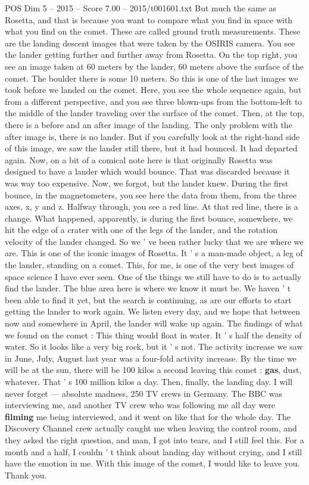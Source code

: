 \begin{textsample}{POS Dim 5 – 2015 – Score 7.00 – 2015/t001601.txt}
But much the same as Rosetta, and that is because you want to compare what you find in space with what you find on the comet.
These are called ground truth measurements.
These are the landing descent images that were taken by the OSIRIS camera.
You see the lander getting further and further away from Rosetta.
On the top right, you see an image taken at 60 meters by the lander, 60 meters above the surface of the comet.
The boulder there is some 10 meters.
So this is one of the last images we took before we landed on the comet.
Here, you see the whole sequence again, but from a different perspective, and you see three blown-ups from the bottom-left to the middle of the lander traveling over the surface of the comet.
Then, at the top, there is a before and an after image of the landing.
The only problem with the after image is, there is no lander.
But if you carefully look at the right-hand side of this image, we saw the lander still there, but it had bounced.
It had departed again.
Now, on a bit of a comical note here is that originally Rosetta was designed to have a lander which would bounce.
That was discarded because it was way too expensive.
Now, we forgot, but the lander knew.
During the first bounce, in the magnetometers, you see here the data from them, from the three axes, x, y and z.
Halfway through, you see a red line.
At that red line, there is a change.
What happened, apparently, is during the first bounce, somewhere, we hit the edge of a crater with one of the legs of the lander, and the rotation velocity of the lander changed.
So we ' ve been rather lucky that we are where we are.
This is one of the iconic images of Rosetta.
It ' s a man-made object, a leg of the lander, standing on a comet.
This, for me, is one of the very best images of space science I have ever seen.
One of the things we still have to do is to actually find the lander.
The blue area here is where we know it must be.
We haven ' t been able to find it yet, but the search is continuing, as are our efforts to start getting the lander to work again.
We listen every day, and we hope that between now and somewhere in April, the lander will wake up again.
The findings of what we found on the comet : This thing would float in water.
It ' s half the density of water.
So it looks like a very big rock, but it ' s not.
The activity increase we saw in June, July, August last year was a four-fold activity increase.
By the time we will be at the sun, there will be 100 kilos a second leaving this comet : \textbf{gas}, dust, whatever.
That ' s 100 million kilos a day.
Then, finally, the landing day.
I will never forget — absolute madness, 250 TV crews in Germany.
The BBC was interviewing me, and another TV crew who was following me all day were \textbf{filming} me being interviewed, and it went on like that for the whole day.
The Discovery Channel crew actually caught me when leaving the control room, and they asked the right question, and man, I got into tears, and I still feel this.
For a month and a half, I couldn ' t think about landing day without crying, and I still have the emotion in me.
With this image of the comet, I would like to leave you.
Thank you.

\end{textsample}

